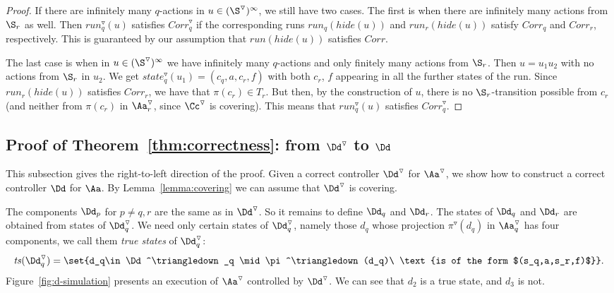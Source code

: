 \documentclass[10pt,a4paper]{article}
\newcommand{\run}{\mathit{run}}
\newcommand{\ts}{\mathit{ts}}
\newcommand{\Cor}{\mathit{Corr}}
\newcommand{\hide}{\mathit{hide}}
\newcommand{\red}[1]{#1^\triangledown}
\newcommand{\state}{\mathit{state}}
\begin{document}
\begin{proof}
  If there are infinitely many $q$-actions in $u\in(\red\S)^\infty$, we
  still have two cases. The first is when there are infinitely many
  actions from $\S_r$ as well. Then $\red\run_q(u)$
  satisfies $\red\Cor_q$ if the corresponding runs $\run_q(\hide(u))$
  and $\run_r(\hide(u))$ satisfy $\Cor_q$ and $\Cor_r$,
  respectively. This is guaranteed by our assumption that $\run(\hide(u))$
  satisfies $\Cor$.

  The last case is when in $u\in(\red\S)^\infty$ we have infinitely
  many $q$-actions and only finitely many actions from $\S_r$. Then $u=u_1u_2$
  with no actions from $\S_r$ in $u_2$. We get $\red\state_q(u_1)=(c_q,a,c_r,f)$
  with both $c_r$, $f$ appearing in all the further states of the
  run. Since $\run_r(\hide(u))$ satisfies $\Cor_r$, we have that
  $\pi(c_r) \in T_r$. But then, by the construction of $u$, there is
  no $\S_r$-transition possible from $c_r$ (and neither from
  $\pi(c_r)$ in $\red\Aa_r$, since $\red\Cc$ is covering). This means that $\red\run_q(u)$
  satisfies $\red\Cor_q$.


\end{proof}




\subsection{Proof of Theorem~\ref{thm:correctness}: from $\red \Dd$
                                to $\Dd$}\label{sec:D}
This subsection gives the
right-to-left direction of the proof. Given a correct controller $\red\Dd$ for
$\red\Aa$, we show how to construct a correct controller $\Dd$ for
$\Aa$. By Lemma~\ref{lemma:covering} we can assume that $\red\Dd$ is
covering.



The components $\Dd_p$ for $p\not=q,r$ are the same as in
$\red\Dd$. So it remains to define
$\Dd_q$ and $\Dd_r$. 
The states of $\Dd_q$ and $\Dd_r$ are obtained from states of
$\red\Dd_q$. We need only certain states of $\red\Dd_q$,
namely those $d_q$ whose projection $\red\pi(d_q)$ in $\red\Aa_q$ has four
components, we call them \emph{true states} of $\red\Dd_q$:
\begin{equation*}
  \ts(\red\Dd_q)=\set{d_q\in \red\Dd_q \mid \red\pi(d_q)\ \text{is of the
      form $(s_q,a,s_r,f)$}}.
\end{equation*}
Figure~\ref{fig:d-simulation}
presents an execution of $\red\Aa$ controlled by $\red\Dd$. We can see
that $d_2$ is a true state, and $d_3$ is not.
\end{document}
